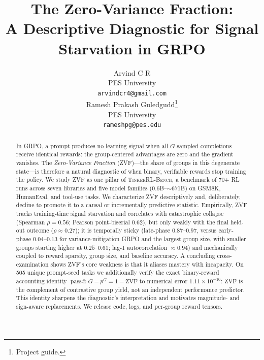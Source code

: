 \documentclass{article}
\title{The Zero-Variance Fraction:\\
       A Descriptive Diagnostic for Signal Starvation in GRPO}
\author{
  Arvind C R \\
  PES University\\
  \texttt{arvindcr4@gmail.com} \\
  \And
  Ramesh Prakash Guledgudd\thanks{Project guide.} \\
  PES University\\
  \texttt{rameshpg@pes.edu} \\
}
\newcommand{\ours}{\textsc{TinkerRL-Bench}}
\begin{document}
\sloppy {}  \hfuzz=2pt
\maketitle
\begin{abstract}
In GRPO, a prompt produces no learning signal when all $G$ sampled completions
receive identical rewards: the group-centered advantages are zero and the gradient
vanishes. The \emph{Zero-Variance Fraction} (ZVF)---the share of groups in this
degenerate state---is therefore a natural diagnostic of when binary, verifiable
rewards stop training the policy. We study ZVF as one pillar of \ours{}, a
benchmark of 70+ RL runs across seven libraries and five model families
($0.6$B--$\sim$671B) on GSM8K, HumanEval, and tool-use tasks. We characterize ZVF
descriptively and, deliberately, decline to promote it to a causal or
incrementally predictive statistic. Empirically, ZVF tracks training-time signal
starvation and correlates with catastrophic collapse (Spearman
$\rho = 0.56$; Pearson point-biserial $0.62$), but only weakly with the final held-out outcome
($\rho \approx 0.27$); it is temporally sticky (late-phase $0.87$--$0.97$, versus
early-phase $0.04$--$0.13$ for variance-mitigation GRPO and the largest group size,
with smaller groups starting higher at $0.25$--$0.61$; lag-1 autocorrelation $\approx 0.94$) and mechanically
coupled to reward sparsity, group size, and baseline accuracy. A concluding
cross-examination shows ZVF's core weakness is that it aliases mastery with
incapacity. On 505 unique prompt-seed tasks we additionally verify the exact
binary-reward accounting identity
$\operatorname{pass@}G-p^G=1-\mathrm{ZVF}$ to numerical error
$1.11\times10^{-16}$: ZVF is the complement of contrastive group yield, not an
independent performance predictor. This identity sharpens the diagnostic's
interpretation and motivates magnitude- and sign-aware replacements. We release code,
logs, and per-group reward tensors.
\end{abstract}
 
\end{document}
